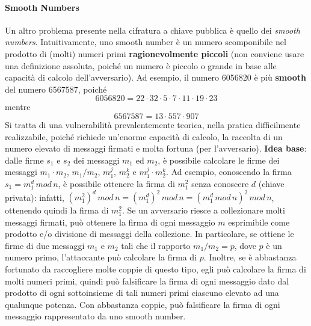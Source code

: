 \paragraph{Smooth Numbers}
Un altro problema presente nella cifratura a chiave pubblica è quello dei \textit{smooth numbers}. Intuitivamente, uno smooth number è un numero scomponibile nel prodotto di (molti) numeri primi \textbf{ragionevolmente piccoli} (non conviene usare una definizione assoluta, poiché un numero è piccolo o grande in base alle capacità di calcolo dell'avversario). Ad esempio, il numero 6056820 è più \textbf{smooth} del numero 6567587, poiché 
\begin{equation}
6056820 = 22 \cdot 32 \cdot 5 \cdot 7 \cdot 11 \cdot 19 \cdot 23
\end{equation}
mentre
\begin{equation}
6567587 = 13 \cdot 557 \cdot 907
\end{equation}
Si tratta di una vulnerabilità prevalentemente teorica, nella pratica difficilmente realizzabile, poiché richiede un'enorme capacità di calcolo, la raccolta di un numero elevato di messaggi firmati e molta fortuna (per l'avversario). \newline \newline
\textbf{Idea base}: dalle firme $s_{1}$ e $s_{2}$ dei messaggi $m_{1}$ ed $m_{2}$, è possibile calcolare le firme dei messaggi $m_{1} \cdot m_{2}$, $m_{1}/m_{2}$, $m_{1}^j$, $m_{2}^k$ e $m_{1}^j \cdot m_{2}^k$. Ad esempio, conoscendo la firma $s_{1} = m_{1}^d \, mod \, n $, è possibile ottenere la firma di $m_{1}^2$ senza conoscere $d$ (chiave privata): infatti, $(m_{1}^2)^d \, mod \, n = (m_{1}^d)^2 \, mod \, n = (m_{1}^d \, mod \, n)^2 \, mod \, n $, ottenendo quindi la firma di $m_{1}^2$. Se un avversario riesce a collezionare molti messaggi firmati, può ottenere la firma di ogni messaggio $m$ esprimibile come prodotto e/o divisione di messaggi della collezione. In particolare, se ottiene le firme di due messaggi $m_{1}$ e $m_{2}$ tali che il rapporto $m_{1}/m_{2}=p$, dove $p$ è un numero primo, l'attaccante può calcolare la firma di $p$. Inoltre, se è abbastanza fortunato da raccogliere molte coppie di questo tipo, egli può calcolare la firma di molti numeri primi, quindi può falsificare la firma di ogni messaggio dato dal prodotto di ogni sottoinsieme di tali numeri primi ciascuno elevato ad una qualunque potenza. Con abbastanza coppie, può falsificare la firma di ogni messaggio rappresentato da uno smooth number. 
\newline \newline
